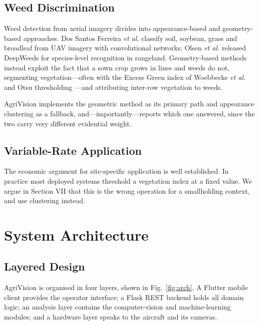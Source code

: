 \documentclass[conference]{IEEEtran}
\begin{document}
\subsection{Weed Discrimination}

Weed detection from aerial imagery divides into appearance-based and
geometry-based approaches. Dos Santos Ferreira \emph{et al.}
\cite{ferreira2017} classify soil, soybean, grass and broadleaf from UAV
imagery with convolutional networks; Olsen \emph{et al.} \cite{olsen2019}
released DeepWeeds for species-level recognition in rangeland. Geometry-based
methods instead exploit the fact that a sown crop grows in lines and weeds do
not, segmenting vegetation---often with the Excess Green index of Woebbecke
\emph{et al.} \cite{woebbecke1995} and Otsu thresholding \cite{otsu1979}---and
attributing inter-row vegetation to weeds.

AgriVision implements the geometric method as its primary path and appearance
clustering as a fallback, and---importantly---reports which one answered, since
the two carry very different evidential weight.

\subsection{Variable-Rate Application}

The economic argument for site-specific application is well established. In
practice most deployed systems threshold a vegetation index at a fixed value.
We argue in Section VII that this is the wrong operation for a smallholding
context, and use clustering instead.

\section{System Architecture}

\subsection{Layered Design}

AgriVision is organised in four layers, shown in Fig.~\ref{fig:arch}. A Flutter
mobile client provides the operator interface; a Flask REST backend holds all
domain logic; an analysis layer contains the computer-vision and machine-learning
modules; and a hardware layer speaks to the aircraft and its cameras.
\end{document}
